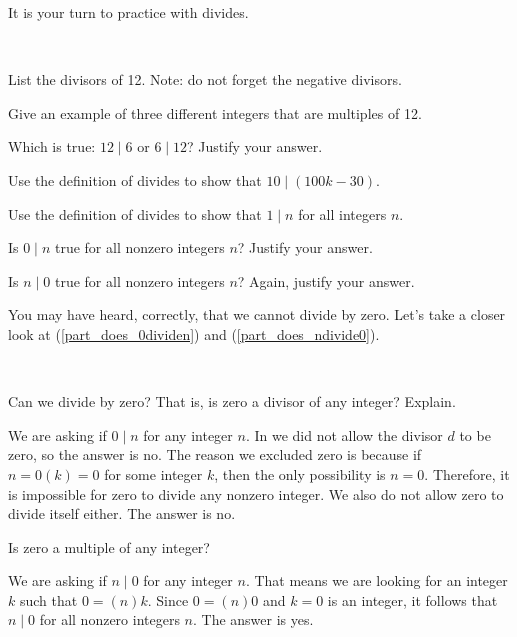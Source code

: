 It is your turn to practice with divides.

\begin{act}[Divides]
\label{act_divides}
~
    \begin{actpart}
        \item List the divisors of 12.  Note: do not forget the negative divisors.
        \item Give an example of three different integers that are multiples of 12.
        \item Which is true: $12 \mid 6$ or $6 \mid 12$?  Justify your answer.
        \item Use the definition of divides to show that $10 \mid (100k-30)$.
        \item Use the definition of divides to show that $1 \mid n$ for all integers $n$.        
        \item  \label{part_does_0dividen} Is $0 \mid n$ true for all nonzero integers $n$?  Justify your answer.
        \item \label{part_does_ndivide0} Is $n \mid 0$ true for all nonzero integers $n$?  Again, justify your answer.
    \end{actpart}
\end{act}

You may have heard, correctly, that we cannot divide by zero.  Let's take a closer look at  (\ref{part_does_0dividen}) and (\ref{part_does_ndivide0}).

\begin{exam}
\label{exam_cannot_divide_by0}
~
    \begin{apart}
        \item  Can we divide by zero?  That is, is zero a divisor of any integer?  Explain.
            \begin{soln}
                We are asking if $0 \mid n$ for any integer $n$. In   we did not allow the divisor $d$ to be zero, so the answer is no.  The reason we excluded zero is because if $n = 0(k) =0$ for some integer $k$, then the only possibility is $n=0$.  Therefore, it is impossible for zero to divide any nonzero integer. We also do not allow zero to divide itself either.  The answer is no.
            \end{soln}
        \item Is zero a multiple of any integer?
            \begin{soln}
                We are asking if $n \mid 0$ for any integer $n$.  That means we are looking for an integer $k$ such that $0 = (n)k$.  Since $0 = (n)0$ and $k=0$ is an integer, it follows that $n \mid 0$ for all nonzero integers $n$. The answer is yes.
            \end{soln} 
    \end{apart}
\end{exam}

